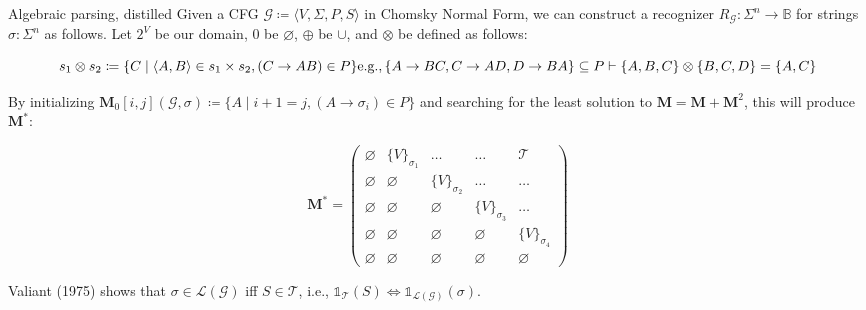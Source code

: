 \documentclass{beamer}
\begin{document}
    \begin{frame}[fragile]{Algebraic parsing, distilled}
        Given a CFG $\mathcal{G} \coloneqq \langle V, \Sigma, P, S\rangle$ in Chomsky Normal Form, we can construct a recognizer $R_\mathcal{G}: \Sigma^n \rightarrow \mathbb{B}$ for strings $\sigma: \Sigma^n$ as follows. Let $2^V$ be our domain, $0$ be $\varnothing$, $\oplus$ be $\cup$, and $\otimes$ be defined as follows:

        \vspace{-7pt}
        \[
            s_1 \otimes s_2 \coloneqq \{C \mid \langle A, B\rangle \in s_1 \times s_2, (C\rightarrow AB) \in P\}\\
            \text{e.g.},
                \{A \rightarrow BC, C \rightarrow AD, D \rightarrow BA\} \subseteq P \vdash \{A, B, C\} \otimes \{B, C, D\} = \{A, C\}
        \]
        \vspace{-20pt}

        \noindent By initializing $\mathbf{M}_0[i, j](\mathcal{G}, \sigma) \coloneqq \{A \mid i + 1 = j, (A \rightarrow \sigma_i) \in P\}$ and searching for the least solution to $\mathbf{M} = \mathbf{M} + \mathbf{M}^2$, this will produce $\mathbf{M}^*$:

        \vspace{-5}
        \[
            \mathbf{M}^* = \begin{pmatrix}
                               \varnothing & \{V\}_{\sigma_1} & \ldots & \ldots & \mathcal{T} \\
                               \varnothing & \varnothing & \{V\}_{\sigma_2} & \ldots & \ldots \\
                               \varnothing & \varnothing & \varnothing & \{V\}_{\sigma_3} & \ldots \\
                               \varnothing & \varnothing & \varnothing & \varnothing & \{V\}_{\sigma_4} \\
                               \varnothing & \varnothing & \varnothing & \varnothing & \varnothing
            \end{pmatrix}
        \]

        \noindent Valiant (1975) shows that $\sigma \in \mathcal{L}(\mathcal{G})$ iff $S \in \mathcal{T}$, i.e., $\mathds{1}_{\mathcal{T}}(S) \iff \mathds{1}_{\mathcal{L}(\mathcal{G})}(\sigma)$.
    \end{frame}
\end{document}
